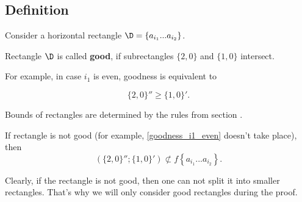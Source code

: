\subsection{Definition}

Consider a horizontal rectangle $\D = \left\{ a_{i_1} ... a_{i_2} \right\}$.

\begin{definition}
	Rectangle $\D$ is called \textbf{good},
	if subrectangles
	$\{2, 0\}$ and $\{1, 0\}$ intersect.
\end{definition}


For example, in case $i_1$ is even, goodness is equivalent to

\begin{equation}\label{goodness_i1_even}
	\{2, 0\}'' \geqslant \{1, 0\}'.
\end{equation}

Bounds of rectangles are determined by the rules from section .

If rectangle is not good (for example, \ref{goodness_i1_even} doesn't take place), then
$$ ( \{2, 0\}'' ; \{1, 0\}' ) \not\subset
f \left\{ a_{i_1} ... a_{i_2} \right\}. $$

Clearly, if the rectangle is not good, then one can not split it into smaller rectangles.
That's why we will only consider good rectangles during the proof.

